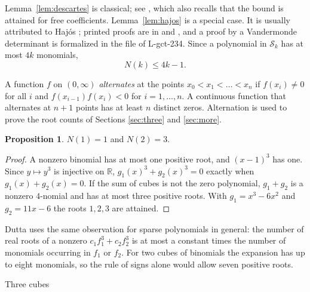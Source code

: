 \documentclass[10pt,a4paper]{article}
\makeatletter
\renewcommand\section{\@startsection{section}{1}{\z@}{1.7em plus .3em minus .2em}{0.25em}%
  {\normalfont\bfseries\fontsize{13.5}{17}\selectfont\raggedright}}
\theoremstyle{definition}
\newtheorem{proposition}[theorem]{Proposition}
\newcommand{\R}{\mathbb{R}}
\newcommand{\row}[1]{L-gct-#1}
\makeatother
\begin{document}
Lemma~\ref{lem:descartes} is classical; see \cite{AlbouyFu}, which also recalls that the bound is attained for free
coefficients. Lemma~\ref{lem:hajos} is a special case. It is usually attributed to Haj\'os \cite{Hajos}; printed
proofs are in \cite[Proposition~3.2]{Lenstra} and \cite[Lemma~3.9]{KoiranSkomra}, and a proof by a Vandermonde
determinant is formalized in the file of \row{234}. Since a polynomial in $\mathcal{S}_k$ has at most $4k$
monomials,
\begin{equation}\label{eq:upper}
N(k)\le4k-1 .
\end{equation}

A function $f$ on $(0,\infty)$ \emph{alternates} at the points $x_0<x_1<\dots<x_n$ if $f(x_i)\ne0$ for all $i$ and
$f(x_{i-1})f(x_i)<0$ for $i=1,\dots,n$. A continuous function that alternates at $n+1$ points has at least $n$
distinct zeros. Alternation is used to prove the root counts of Sections \ref{sec:three} and \ref{sec:more}.

\begin{proposition}\label{prop:two}
$N(1)=1$ and $N(2)=3$.
\end{proposition}
\begin{proof}
A nonzero binomial has at most one positive root, and $(x-1)^3$ has one. Since $y\mapsto y^3$ is injective on $\R$,
$g_1(x)^3+g_2(x)^3=0$ exactly when $g_1(x)+g_2(x)=0$. If the sum of cubes is not the zero polynomial, $g_1+g_2$ is
a nonzero $4$-nomial and has at most three positive roots. With $g_1=x^3-6x^2$ and $g_2=11x-6$ the roots $1,2,3$
are attained.
\end{proof}

Dutta \cite[Theorem~10]{Dutta} uses the same observation for sparse polynomials in general: the number of real roots
of a nonzero $c_1f_1^3+c_2f_2^3$ is at most a constant times the number of monomials occurring in $f_1$ or $f_2$.
For two cubes of binomials the expansion has up to eight monomials, so the rule of signs alone would allow seven
positive roots.

\section{Three cubes}\label{sec:three}
\end{document}
